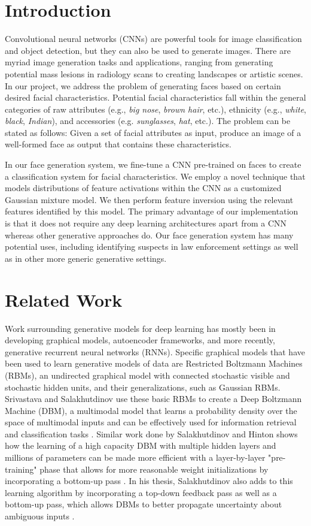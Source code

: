 \documentclass[10pt,twocolumn,letterpaper]{article}
\begin{document}
\section{Introduction}
Convolutional neural networks (CNNs) are powerful tools for image classification and object detection, but they can also be used to generate images.
There are myriad image generation tasks and applications, ranging from generating potential mass lesions in radiology scans to creating landscapes or artistic scenes.
In our project, we address the problem of generating faces based on certain desired facial characteristics.
Potential facial characteristics fall within the general categories of raw attributes (e.g., \textit{big nose}, \textit{brown hair}, etc.), ethnicity (e.g., \textit{white}, \textit{black}, \textit{Indian}), and accessories (e.g. \textit{sunglasses}, \textit{hat}, etc.). 
The problem can be stated as follows:
Given a set of facial attributes as input, produce an image of a well-formed face as output that contains these characteristics.

In our face generation system, we fine-tune a CNN pre-trained on faces to create a classification system for facial characteristics. 
We employ a novel technique that models distributions of feature activations within the CNN as a customized Gaussian mixture model.
We then perform feature inversion using the relevant features identified by this model.
The primary advantage of our implementation is that it does not require any deep learning architectures apart from a CNN whereas other generative approaches do.
Our face generation system has many potential uses, including identifying suspects in law enforcement settings as well as in other more generic generative settings.

\section{Related Work}
Work surrounding generative models for deep learning has mostly been in developing graphical models, autoencoder frameworks, and more recently, generative recurrent neural networks (RNNs). Specific graphical models that have been used to learn generative models of data are Restricted Boltzmann Machines (RBMs), an undirected graphical model with connected stochastic visible and stochastic hidden units, and their generalizations, such as Gaussian RBMs. Srivastava and Salakhutdinov use these basic RBMs to create a Deep Boltzmann Machine (DBM), a multimodal model that learns a probability density over the space of multimodal inputs and can be effectively used for information retrieval and classification tasks \cite{NIPS20124683}. Similar work done by Salakhutdinov and Hinton shows how the learning of a high capacity DBM with multiple hidden layers and millions of parameters can be made more efficient with a layer-by-layer "pre-training" phase that allows for more reasonable weight initializations by incorporating a bottom-up pass \cite{salakhutdinov2009deep}. In his thesis, Salakhutdinov also adds to this learning algorithm by incorporating a top-down feedback pass as well as a bottom-up pass, which allows DBMs to better propagate uncertainty about ambiguous inputs \cite{salakhutdinov2009learning}.
\end{document}
